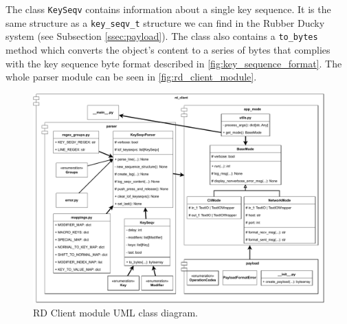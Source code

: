 The class \verb|KeySeqv| contains information about a single key sequence. It is the same structure as a \verb|key_seqv_t| structure we can find in the Rubber Ducky system (see Subsection \ref{ssec:payload}). The class also contains a \verb|to_bytes| method which converts the object's content to a series of bytes that complies with the key sequence byte format described in \autoref{fig:key_sequence_format}. The whole parser module can be seen in \autoref{fig:rd_client_module}.
\begin{figure}[ht]
    \centering
    \includegraphics[width=\linewidth]{./obrazky-figures/rd_client_module.pdf}
    \caption{RD Client module UML class diagram.}
    \label{fig:rd_client_module}
\end{figure}

